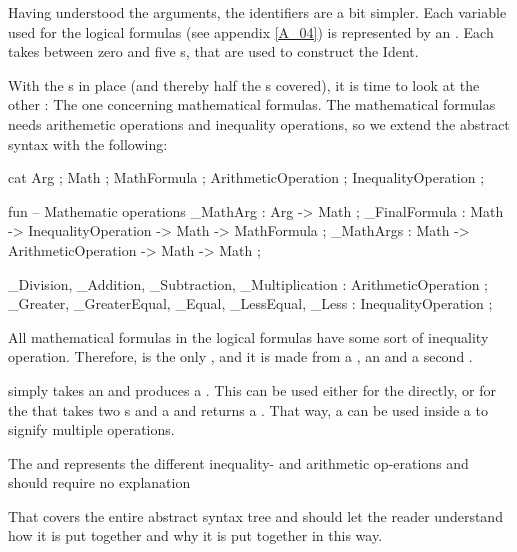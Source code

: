 Having understood the arguments, the identifiers are a bit simpler. Each variable used for the logical formulas (see appendix \ref{A_04}) is represented by an . Each  takes between zero and five s, that are used to construct the Ident.

With the s in place (and thereby half the s covered),  it is time to look at the other : The one concerning mathematical formulas. The mathematical formulas needs arithemetic operations and inequality operations, so we extend the abstract syntax with the following:

\begin{lstgf}
    cat
        Arg ; Math ; MathFormula ; ArithmeticOperation ; InequalityOperation ;

    fun
        -- Mathematic operations
        _MathArg : Arg -> Math ;
        _FinalFormula : Math -> InequalityOperation -> Math -> MathFormula ;
        _MathArgs : Math -> ArithmeticOperation -> Math -> Math ;

        _Division, _Addition, _Subtraction, _Multiplication : ArithmeticOperation ;
        _Greater, _GreaterEqual, _Equal, _LessEqual, _Less : InequalityOperation ;
\end{lstgf}

All mathematical formulas in the logical formulas have some sort of inequality operation. Therefore,  is the only , and it is made from a , an  and a second .

 simply takes an  and produces a . This can be used either for the  directly, or for the  that takes two s and a  and returns a . That way, a  can be used inside a  to signify multiple operations.

The  and  represents the different inequality- and arithmetic op-erations and should require no explanation

That covers the entire abstract syntax tree and should let the reader understand how it is put together and why it is put together in this way.
